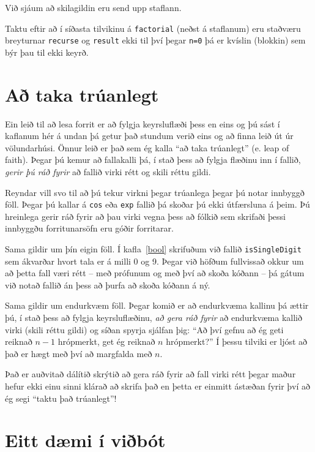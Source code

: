 \vspace{0.1in}
\centerline{}
\vspace{0.1in}
%
Við sjáum að skilagildin eru send upp staflann.

Taktu eftir að í síðasta tilvikinu á {\tt factorial} (neðst á staflanum) eru staðværu breyturnar {\tt recurse} og {\tt result} ekki til því þegar 
{\tt n=0} þá er kvíslin (blokkin) sem býr þau til ekki keyrð.

\section{Að taka trúanlegt}

Ein leið til að lesa forrit er að fylgja keyrsluflæði þess en eins og þú sást í kaflanum hér á undan þá getur það stundum verið eins og að finna leið út úr völundarhúsi.
Önnur leið er það sem ég kalla ``að taka trúanlegt'' (e. leap of faith).
Þegar þú kemur að fallakalli þá, í stað þess að fylgja flæðinu inn í fallið, \textit{gerir þú ráð fyrir} að fallið virki rétt og skili réttu gildi.

Reyndar vill svo til að þú tekur virkni þegar trúanlega þegar þú notar innbyggð föll.
Þegar þú kallar á {\tt cos} eða {\tt exp} fallið þá skoðar þú ekki útfærsluna á þeim.
Þú hreinlega gerir ráð fyrir að þau virki vegna þess að fólkið sem skrifaði þessi innbyggðu forritunarsöfn eru góðir forritarar.

Sama gildir um þín eigin föll.
Í kafla~\ref{bool} skrifuðum við fallið {\tt isSingleDigit} sem ákvarðar hvort tala er á milli 0 og 9.
Þegar við höfðum fullvissað okkur um að þetta fall væri rétt -- með prófunum og með því að skoða kóðann -- þá gátum við notað fallið án þess að þurfa að skoða kóðann á ný.

Sama gildir um endurkvæm föll.
Þegar komið er að endurkvæma kallinu þá ættir þú, í stað þess að fylgja keyrsluflæðinu, \textit{að gera ráð fyrir} að endurkvæma kallið virki (skili réttu gildi)
og síðan spyrja sjálfan þig:
``Að því gefnu að ég geti reiknað $n-1$ hrópmerkt, get ég reiknað $n$ hrópmerkt?''
Í þessu tilviki er ljóst að það er hægt með því að margfalda með $n$.

Það er auðvitað dálítið skrýtið að gera ráð fyrir að fall virki rétt þegar maður hefur ekki einu sinni klárað að skrifa það en þetta er einmitt ástæðan fyrir því að ég segi ``taktu það trúanlegt''!

\section{Eitt dæmi í viðbót}

